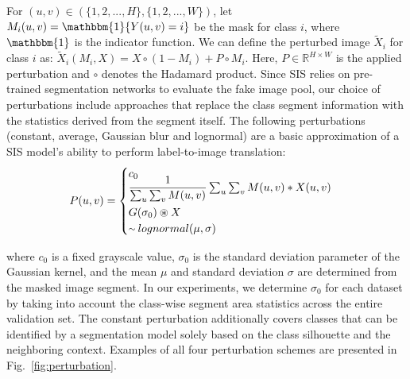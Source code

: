 \documentclass[final]{cvpr}
\newcommand\+{\mkern4mu}
\begin{document}
For \( (u, v) \in (\{1, 2,..., H\}, \{1, 2,..., W\}) \), let \(M_i(u, v) = \mathbbm{1}\{Y(u, v) = i\} \) be the mask for class $i$, where $\mathbbm{1}$ is the indicator function. We can define the perturbed image $\tilde{X}_i$ for class $i$ as: \(\tilde{X}_i(M_i, X) = X \circ (1-M_i) + P \circ M_i\). Here, \(P \in \mathbb{R}^{H \times W}\) is the applied perturbation and $\circ$ denotes the Hadamard product. Since SIS relies on pre-trained segmentation networks to evaluate the fake image pool, our choice of perturbations include approaches that replace the class segment information with the statistics derived from the segment itself. The following perturbations (constant, average, Gaussian blur and lognormal) are a basic approximation of a SIS model's ability to perform label-to-image translation:
\begin{equation}
	P(u, v) = \begin{cases}
		c_{0}\\[-5pt]
		\dfrac{1}{\sum_{u}\sum_{v}M(u, v)}\sum_{u}\sum_{v} M(u, v) * X(u, v)\\[8pt]
		G(\sigma_0) \circledast X \\
		{\raise.17ex\hbox{$\scriptstyle\mathtt{\sim}$}}\+ lognormal(\mu, \sigma)
	\end{cases}\label{eq:perturbation_schemes}
\end{equation}

where $c_0$ is a fixed grayscale value, $\sigma_0$ is the standard deviation parameter of the Gaussian kernel, and the mean $\mu$ and standard deviation $\sigma$ are determined from the masked image segment. In our experiments, we determine $\sigma_0$ for each dataset by taking into account the class-wise segment area statistics across the entire validation set. The constant perturbation additionally covers classes that can be identified by a segmentation model solely based on the class silhouette and the neighboring context. Examples of all four perturbation schemes are presented in Fig.~\ref{fig:perturbation}.   
\end{document}
